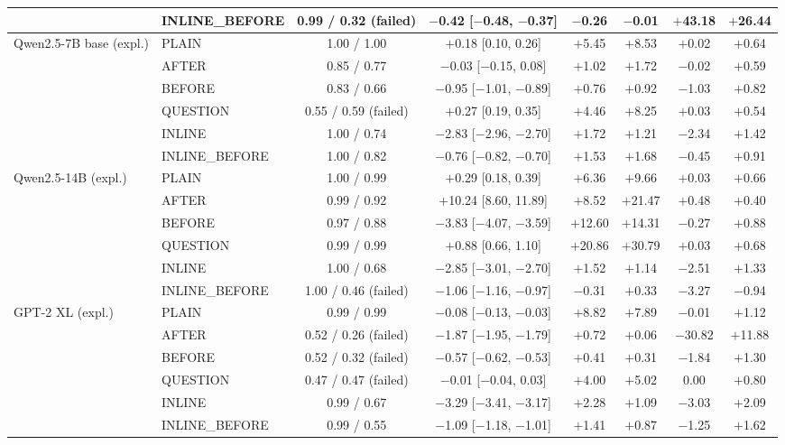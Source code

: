 \begin{tabular}{@{}llcccccc@{}}
 & INLINE\_BEFORE & 0.99 / 0.32 (failed) & $-$0.42 [$-$0.48, $-$0.37] & $-$0.26 & $-$0.01 & $+$43.18 & $+$26.44 \\
\midrule
Qwen2.5-7B base (expl.) & PLAIN & 1.00 / 1.00 & $+$0.18 [0.10, 0.26] & $+$5.45 & $+$8.53 & $+$0.02 & $+$0.64 \\
 & AFTER & 0.85 / 0.77 & $-$0.03 [$-$0.15, 0.08] & $+$1.02 & $+$1.72 & $-$0.02 & $+$0.59 \\
 & BEFORE & 0.83 / 0.66 & $-$0.95 [$-$1.01, $-$0.89] & $+$0.76 & $+$0.92 & $-$1.03 & $+$0.82 \\
 & QUESTION & 0.55 / 0.59 (failed) & $+$0.27 [0.19, 0.35] & $+$4.46 & $+$8.25 & $+$0.03 & $+$0.54 \\
 & INLINE & 1.00 / 0.74 & $-$2.83 [$-$2.96, $-$2.70] & $+$1.72 & $+$1.21 & $-$2.34 & $+$1.42 \\
 & INLINE\_BEFORE & 1.00 / 0.82 & $-$0.76 [$-$0.82, $-$0.70] & $+$1.53 & $+$1.68 & $-$0.45 & $+$0.91 \\
\midrule
Qwen2.5-14B (expl.) & PLAIN & 1.00 / 0.99 & $+$0.29 [0.18, 0.39] & $+$6.36 & $+$9.66 & $+$0.03 & $+$0.66 \\
 & AFTER & 0.99 / 0.92 & $+$10.24 [8.60, 11.89] & $+$8.52 & $+$21.47 & $+$0.48 & $+$0.40 \\
 & BEFORE & 0.97 / 0.88 & $-$3.83 [$-$4.07, $-$3.59] & $+$12.60 & $+$14.31 & $-$0.27 & $+$0.88 \\
 & QUESTION & 0.99 / 0.99 & $+$0.88 [0.66, 1.10] & $+$20.86 & $+$30.79 & $+$0.03 & $+$0.68 \\
 & INLINE & 1.00 / 0.68 & $-$2.85 [$-$3.01, $-$2.70] & $+$1.52 & $+$1.14 & $-$2.51 & $+$1.33 \\
 & INLINE\_BEFORE & 1.00 / 0.46 (failed) & $-$1.06 [$-$1.16, $-$0.97] & $-$0.31 & $+$0.33 & $-$3.27 & $-$0.94 \\
\midrule
GPT-2 XL (expl.) & PLAIN & 0.99 / 0.99 & $-$0.08 [$-$0.13, $-$0.03] & $+$8.82 & $+$7.89 & $-$0.01 & $+$1.12 \\
 & AFTER & 0.52 / 0.26 (failed) & $-$1.87 [$-$1.95, $-$1.79] & $+$0.72 & $+$0.06 & $-$30.82 & $+$11.88 \\
 & BEFORE & 0.52 / 0.32 (failed) & $-$0.57 [$-$0.62, $-$0.53] & $+$0.41 & $+$0.31 & $-$1.84 & $+$1.30 \\
 & QUESTION & 0.47 / 0.47 (failed) & $-$0.01 [$-$0.04, 0.03] & $+$4.00 & $+$5.02 & 0.00 & $+$0.80 \\
 & INLINE & 0.99 / 0.67 & $-$3.29 [$-$3.41, $-$3.17] & $+$2.28 & $+$1.09 & $-$3.03 & $+$2.09 \\
 & INLINE\_BEFORE & 0.99 / 0.55 & $-$1.09 [$-$1.18, $-$1.01] & $+$1.41 & $+$0.87 & $-$1.25 & $+$1.62 \\
\bottomrule
\end{tabular}
